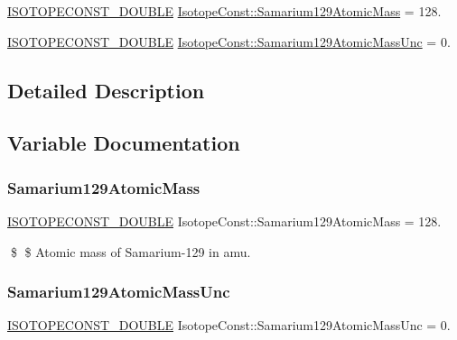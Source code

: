 \begin{DoxyCompactItemize}
\item 
\mbox{\hyperlink{group___isotope_const-_macros_ga8f45a7272ce02c0b4c65c44636ed719a}{I\+S\+O\+T\+O\+P\+E\+C\+O\+N\+S\+T\+\_\+\+D\+O\+U\+B\+LE}} \mbox{\hyperlink{group___isotope_const-_samarium-_sm129_ga14200b79e8f668be6b60ceba713b1b15}{Isotope\+Const\+::\+Samarium129\+Atomic\+Mass}} = 128.
\item 
\mbox{\hyperlink{group___isotope_const-_macros_ga8f45a7272ce02c0b4c65c44636ed719a}{I\+S\+O\+T\+O\+P\+E\+C\+O\+N\+S\+T\+\_\+\+D\+O\+U\+B\+LE}} \mbox{\hyperlink{group___isotope_const-_samarium-_sm129_ga17bdf897d040a03710db85fa7e39f578}{Isotope\+Const\+::\+Samarium129\+Atomic\+Mass\+Unc}} = 0.
\end{DoxyCompactItemize}


\subsection{Detailed Description}


\subsection{Variable Documentation}
\mbox{\label{group___isotope_const-_samarium-_sm129_ga14200b79e8f668be6b60ceba713b1b15}} 
\subsubsection{\texorpdfstring{Samarium129\+Atomic\+Mass}{Samarium129AtomicMass}}
{\footnotesize\ttfamily \mbox{\hyperlink{group___isotope_const-_macros_ga8f45a7272ce02c0b4c65c44636ed719a}{I\+S\+O\+T\+O\+P\+E\+C\+O\+N\+S\+T\+\_\+\+D\+O\+U\+B\+LE}} Isotope\+Const\+::\+Samarium129\+Atomic\+Mass = 128.}

\$ \$ Atomic mass of Samarium-\/129 in amu. \mbox{\label{group___isotope_const-_samarium-_sm129_ga17bdf897d040a03710db85fa7e39f578}} 
\subsubsection{\texorpdfstring{Samarium129\+Atomic\+Mass\+Unc}{Samarium129AtomicMassUnc}}
{\footnotesize\ttfamily \mbox{\hyperlink{group___isotope_const-_macros_ga8f45a7272ce02c0b4c65c44636ed719a}{I\+S\+O\+T\+O\+P\+E\+C\+O\+N\+S\+T\+\_\+\+D\+O\+U\+B\+LE}} Isotope\+Const\+::\+Samarium129\+Atomic\+Mass\+Unc = 0.}

